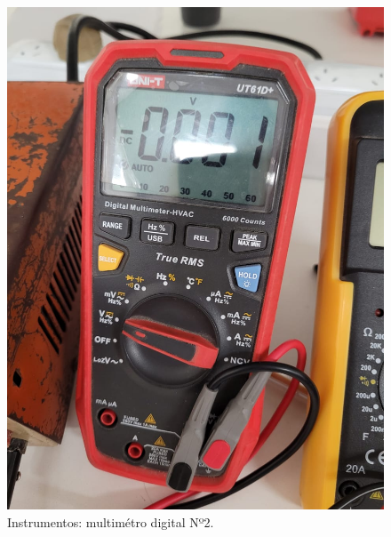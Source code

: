 \documentclass[chaptersright]{informeutn}
\begin{document}
    \begin{figure}[h!]
        \centering
        \begin{minipage}{0.3\textwidth}
            \centering
            \includegraphics[width=\textwidth]{pictures/multimetro-gaston.jpeg}
            \caption{Instrumentos: multimétro digital Nº2.}
        \end{minipage}
        \hspace{0.05\textwidth} %
        \begin{minipage}{0.3\textwidth}
            \centering

\end{minipage}
\end{figure}
\end{document}
